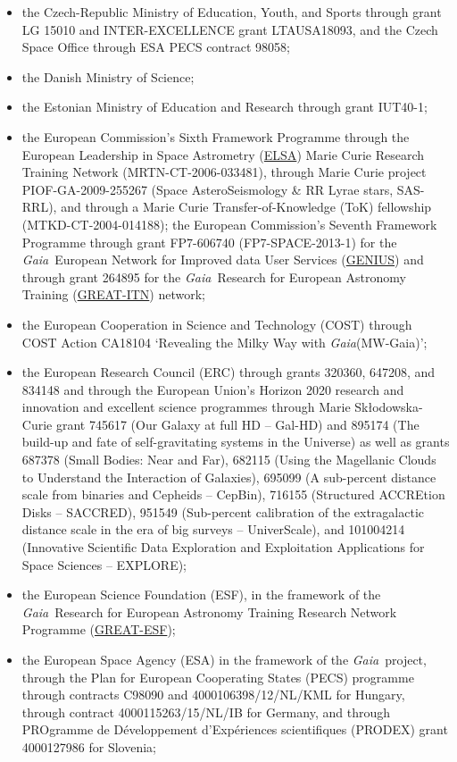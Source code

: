 \documentclass[longauth]{aa}
\newcommand\gaia{\textit{Gaia}\xspace}
\begin{document}
\begin{appendix}
\begin{itemize}
\item the Czech-Republic Ministry of Education, Youth, and Sports through grant LG 15010 and INTER-EXCELLENCE grant LTAUSA18093, and the Czech Space Office through ESA PECS contract 98058;
\item the Danish Ministry of Science;
\item the Estonian Ministry of Education and Research through grant IUT40-1;
\item the European Commission’s Sixth Framework Programme through the European Leadership in Space Astrometry (\href{https://www.cosmos.esa.int/web/gaia/elsa-rtn-programme}{ELSA}) Marie Curie Research Training Network (MRTN-CT-2006-033481), through Marie Curie project PIOF-GA-2009-255267 (Space AsteroSeismology \& RR Lyrae stars, SAS-RRL), and through a Marie Curie Transfer-of-Knowledge (ToK) fellowship (MTKD-CT-2004-014188); the European Commission's Seventh Framework Programme through grant FP7-606740 (FP7-SPACE-2013-1) for the \gaia\ European Network for Improved data User Services (\href{https://gaia.ub.edu/twiki/do/view/GENIUS/}{GENIUS}) and through grant 264895 for the \gaia\ Research for European Astronomy Training (\href{https://www.cosmos.esa.int/web/gaia/great-programme}{GREAT-ITN}) network;
\item the European Cooperation in Science and Technology (COST) through COST Action CA18104 `Revealing the Milky Way with \gaia (MW-Gaia)';
\item the European Research Council (ERC) through grants 320360, 647208, and 834148 and through the European Union’s Horizon 2020 research and innovation and excellent science programmes through Marie Sk{\l}odowska-Curie grant 745617 (Our Galaxy at full HD -- Gal-HD) and 895174 (The build-up and fate of self-gravitating systems in the Universe) as well as grants 687378 (Small Bodies: Near and Far), 682115 (Using the Magellanic Clouds to Understand the Interaction of Galaxies), 695099 (A sub-percent distance scale from binaries and Cepheids -- CepBin), 716155 (Structured ACCREtion Disks -- SACCRED), 951549 (Sub-percent calibration of the extragalactic distance scale in the era of big surveys -- UniverScale), and 101004214 (Innovative Scientific Data Exploration and Exploitation Applications for Space Sciences -- EXPLORE);
\item the European Science Foundation (ESF), in the framework of the \gaia\ Research for European Astronomy Training Research Network Programme (\href{https://www.cosmos.esa.int/web/gaia/great-programme}{GREAT-ESF});
\item the European Space Agency (ESA) in the framework of the \gaia\ project, through the Plan for European Cooperating States (PECS) programme through contracts C98090 and 4000106398/12/NL/KML for Hungary, through contract 4000115263/15/NL/IB for Germany, and through PROgramme de D\'{e}veloppement d'Exp\'{e}riences scientifiques (PRODEX) grant 4000127986 for Slovenia;  

\end{itemize}
\end{appendix}
\end{document}
